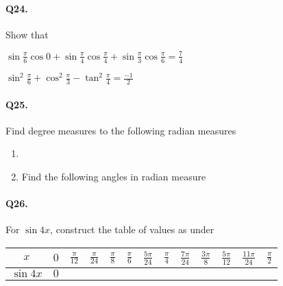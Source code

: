 \documentclass{article}
\begin{document}
\paragraph{Q24.}
Show that

\begin{enumerate*}[label=\alph*)]
  \item $\sin \frac{\pi}{6} \cos 0 + \sin \frac{\pi}{4} \cos \frac{\pi}{4} + \sin \frac{\pi}{3} \cos \frac{\pi}{6} = \frac{7}{4}$
  \item $\sin^{2} \frac{\pi}{6} + \cos^{2} \frac{\pi}{3} - \tan^{2} \frac{\pi}{4} = \frac{-1}{2}$
\end{enumerate*}

\paragraph{Q25.}
Find degree measures to the following radian measures
\begin{enumerate}[label=\alph*)]
  \item
  \item Find the following angles in radian measure
\end{enumerate}

\paragraph{Q26.}
For $\sin 4x$, construct the table of values as under

\begin{tabular}{|c|c|c|c|c|c|c|c|c|c|c|c|c|}
  \hline
  $x$ & $0$ & $\frac{\pi}{12}$ & $\frac{\pi}{24}$ & $\frac{\pi}{8}$ & $\frac{\pi}{6}$ & $\frac{5\pi}{24}$ & $\frac{\pi}{4}$ & $\frac{7\pi}{24}$ & $\frac{3\pi}{8}$ & $\frac{5\pi}{12}$ & $\frac{11\pi}{24}$ & $\frac{\pi}{2}$ \\[3pt]
  \hline
$\sin 4x$ & $0$ & & & & & & & & & & &\\
  \hline
\end{tabular}
\end{document}

